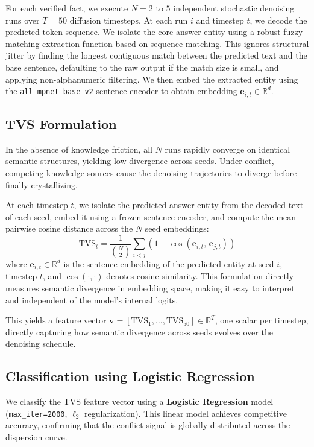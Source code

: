 \documentclass[11pt]{article}
\begin{document}
For each verified fact, we execute $N=2$ to $5$ independent stochastic denoising runs over $T=50$ diffusion timesteps. At each run $i$ and timestep $t$, we decode the predicted token sequence. We isolate the core answer entity using a robust fuzzy matching extraction function based on sequence matching. This ignores structural jitter by finding the longest contiguous match between the predicted text and the base sentence, defaulting to the raw output if the match size is small, and applying non-alphanumeric filtering. We then embed the extracted entity using the \texttt{all-mpnet-base-v2} sentence encoder to obtain embedding $\mathbf{e}_{i,t} \in \mathbb{R}^d$.

\subsection{TVS Formulation}
In the absence of knowledge friction, all $N$ runs rapidly converge on identical semantic structures, yielding low divergence across seeds. Under conflict, competing knowledge sources cause the denoising trajectories to diverge before finally crystallizing.

At each timestep $t$, we isolate the predicted answer entity from the decoded text of each seed, embed it using a frozen sentence encoder, and compute the mean pairwise cosine distance across the $N$ seed embeddings:
\begin{equation}
  \text{TVS}_t = \frac{1}{\binom{N}{2}} \sum_{i < j} \left(1 - \cos(\mathbf{e}_{i,t},\, \mathbf{e}_{j,t})\right)
\end{equation}
where $\mathbf{e}_{i,t} \in \mathbb{R}^d$ is the sentence embedding of the predicted entity at seed $i$, timestep $t$, and $\cos(\cdot,\cdot)$ denotes cosine similarity. This formulation directly measures semantic divergence in embedding space, making it easy to interpret and independent of the model's internal logits.

This yields a feature vector $\mathbf{v} = [\text{TVS}_1, \dots, \text{TVS}_{50}] \in \mathbb{R}^{T}$, one scalar per timestep, directly capturing how semantic divergence across seeds evolves over the denoising schedule.

\subsection{Classification using Logistic Regression}
We classify the TVS feature vector using a \textbf{Logistic Regression} model (\texttt{max\_iter=2000}, $\ell_2$ regularization). This linear model achieves competitive accuracy, confirming that the conflict signal is globally distributed across the dispersion curve.
\end{document}
